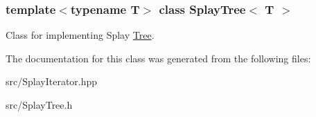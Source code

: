 \subsubsection*{template$<$typename T$>$\newline
class Splay\+Tree$<$ T $>$}

Class for implementing Splay \hyperlink{classTree}{Tree}. 

The documentation for this class was generated from the following files\+:\begin{DoxyCompactItemize}
\item 
src/Splay\+Iterator.\+hpp\item 
src/Splay\+Tree.\+h\end{DoxyCompactItemize}
